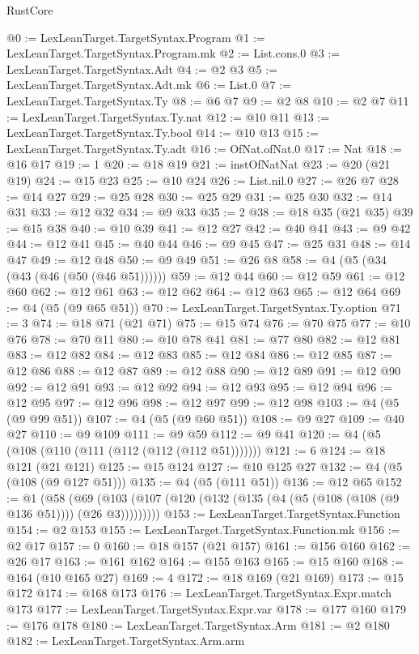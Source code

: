 \begin{lexlean}{RustCore}
\begin{coremodule}
@0 := LexLeanTarget.TargetSyntax.Program
@1 := LexLeanTarget.TargetSyntax.Program.mk
@2 := List.cons.{0}
@3 := LexLeanTarget.TargetSyntax.Adt
@4 := @2 @3
@5 := LexLeanTarget.TargetSyntax.Adt.mk
@6 := List.{0}
@7 := LexLeanTarget.TargetSyntax.Ty
@8 := @6 @7
@9 := @2 @8
@10 := @2 @7
@11 := LexLeanTarget.TargetSyntax.Ty.nat
@12 := @10 @11
@13 := LexLeanTarget.TargetSyntax.Ty.bool
@14 := @10 @13
@15 := LexLeanTarget.TargetSyntax.Ty.adt
@16 := OfNat.ofNat.{0}
@17 := Nat
@18 := @16 @17
@19 := 1
@20 := @18 @19
@21 := instOfNatNat
@23 := @20 (@21 @19)
@24 := @15 @23
@25 := @10 @24
@26 := List.nil.{0}
@27 := @26 @7
@28 := @14 @27
@29 := @25 @28
@30 := @25 @29
@31 := @25 @30
@32 := @14 @31
@33 := @12 @32
@34 := @9 @33
@35 := 2
@38 := @18 @35 (@21 @35)
@39 := @15 @38
@40 := @10 @39
@41 := @12 @27
@42 := @40 @41
@43 := @9 @42
@44 := @12 @41
@45 := @40 @44
@46 := @9 @45
@47 := @25 @31
@48 := @14 @47
@49 := @12 @48
@50 := @9 @49
@51 := @26 @8
@58 := @4 (@5 (@34 (@43 (@46 (@50 (@46 @51))))))
@59 := @12 @44
@60 := @12 @59
@61 := @12 @60
@62 := @12 @61
@63 := @12 @62
@64 := @12 @63
@65 := @12 @64
@69 := @4 (@5 (@9 @65 @51))
@70 := LexLeanTarget.TargetSyntax.Ty.option
@71 := 3
@74 := @18 @71 (@21 @71)
@75 := @15 @74
@76 := @70 @75
@77 := @10 @76
@78 := @70 @11
@80 := @10 @78 @41
@81 := @77 @80
@82 := @12 @81
@83 := @12 @82
@84 := @12 @83
@85 := @12 @84
@86 := @12 @85
@87 := @12 @86
@88 := @12 @87
@89 := @12 @88
@90 := @12 @89
@91 := @12 @90
@92 := @12 @91
@93 := @12 @92
@94 := @12 @93
@95 := @12 @94
@96 := @12 @95
@97 := @12 @96
@98 := @12 @97
@99 := @12 @98
@103 := @4 (@5 (@9 @99 @51))
@107 := @4 (@5 (@9 @60 @51))
@108 := @9 @27
@109 := @40 @27
@110 := @9 @109
@111 := @9 @59
@112 := @9 @41
@120 := @4 (@5 (@108 (@110 (@111 (@112 (@112 (@112 @51)))))))
@121 := 6
@124 := @18 @121 (@21 @121)
@125 := @15 @124
@127 := @10 @125 @27
@132 := @4 (@5 (@108 (@9 @127 @51)))
@135 := @4 (@5 (@111 @51))
@136 := @12 @65
@152 := @1
    (@58 (@69 (@103 (@107 (@120 (@132 (@135 (@4 (@5 (@108 (@108 (@9 @136 @51)))) (@26 @3)))))))))
@153 := LexLeanTarget.TargetSyntax.Function
@154 := @2 @153
@155 := LexLeanTarget.TargetSyntax.Function.mk
@156 := @2 @17
@157 := 0
@160 := @18 @157 (@21 @157)
@161 := @156 @160
@162 := @26 @17
@163 := @161 @162
@164 := @155 @163
@165 := @15 @160
@168 := @164 (@10 @165 @27)
@169 := 4
@172 := @18 @169 (@21 @169)
@173 := @15 @172
@174 := @168 @173
@176 := LexLeanTarget.TargetSyntax.Expr.match @173
@177 := LexLeanTarget.TargetSyntax.Expr.var
@178 := @177 @160
@179 := @176 @178
@180 := LexLeanTarget.TargetSyntax.Arm
@181 := @2 @180
@182 := LexLeanTarget.TargetSyntax.Arm.arm

\end{coremodule}
\end{lexlean}
